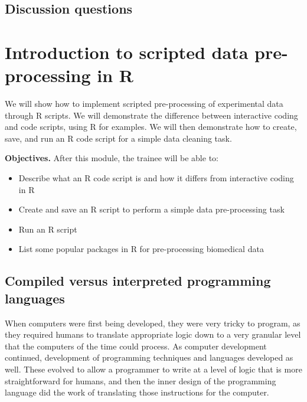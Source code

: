 \documentclass[]{tufte-book}
\providecommand{\tightlist}{%
  \setlength{\itemsep}{0pt}\setlength{\parskip}{0pt}}
\begin{document}
\hypertarget{discussion-questions-5}{%
\subsection{Discussion questions}\label{discussion-questions-5}}

\hypertarget{module13}{%
\section{Introduction to scripted data pre-processing in R}\label{module13}}

We will show how to implement scripted pre-processing of experimental data
through R scripts. We will demonstrate the difference between interactive coding
and code scripts, using R for examples. We will then demonstrate how to create,
save, and run an R code script for a simple data cleaning task.

\textbf{Objectives.} After this module, the trainee will be able to:

\begin{itemize}
\tightlist
\item
  Describe what an R code script is and how it differs from interactive
  coding in R
\item
  Create and save an R script to perform a simple data pre-processing task
\item
  Run an R script
\item
  List some popular packages in R for pre-processing biomedical data
\end{itemize}

\hypertarget{compiled-versus-interpreted-programming-languages}{%
\subsection{Compiled versus interpreted programming languages}\label{compiled-versus-interpreted-programming-languages}}

When computers were first being developed, they were very tricky to program,
as they required humans to translate appropriate logic down to a very granular
level that the computers of the time could process. As computer development
continued, development of programming techniques and languages developed as
well. These evolved to allow a programmer to write at a level of logic that
is more straightforward for humans, and then the inner design of the programming
language did the work of translating those instructions for the computer.
\end{document}
